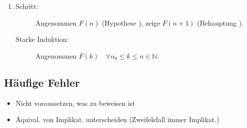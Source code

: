 \begin{description}
\begin{enumerate}
      \item \begin{description}
              \item [Schritt:]
                    Angenommen
                    $F(n)$ (Hypothese ),
                    zeige $F(n + 1)$ (Behauptung ).
              \item [Starke Induktion:]
                    Angenommen
                    $F(k) \quad \forall n_0 \leq k \leq n \in \mathbb{N}$.
            \end{description}
    \end{enumerate}
\end{description}

\subsection{Häufige Fehler}

\begin{itemize}
  \item Nicht voraussetzen, was zu beweisen ist

  \item Äquival. von Implikat. unterscheiden (Zweifelsfall immer Implikat.)
\end{itemize}